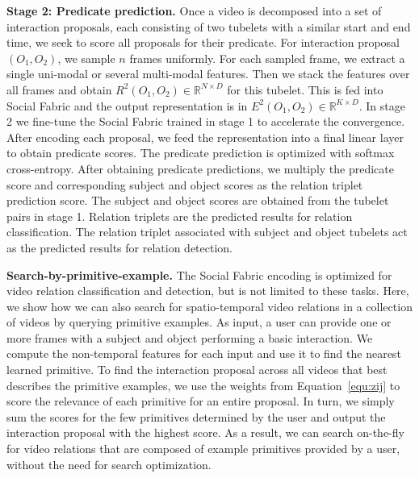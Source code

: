 \documentclass[10pt,twocolumn,letterpaper]{article}
\begin{document}
\textbf{Stage 2: Predicate prediction.}
Once a video is decomposed into a set of interaction proposals, each consisting of two tubelets with a similar start and end time, we seek to score all proposals for their predicate.
For interaction proposal $(O_1, O_2)$, we sample $n$ frames uniformly.
For each sampled frame, we extract a single uni-modal or several multi-modal features. Then we stack the features over all frames and obtain $R^2(O_1, O_2) \in \mathbb{R}^{N \times D}$ for this tubelet. This is fed into Social Fabric and the output representation is in $E^2(O_1,O_2) \in \mathbb{R}^{K \times D}$. 
In stage 2 we fine-tune the Social Fabric trained in stage 1 to accelerate the convergence. After encoding each proposal, we feed the representation into a final linear layer to obtain predicate scores. The predicate prediction is optimized with softmax cross-entropy.
After obtaining predicate predictions, we multiply the predicate score and corresponding subject and object scores as the relation triplet prediction score. The subject and object scores are obtained from the tubelet pairs in stage 1. Relation triplets are the predicted results for relation classification. The relation triplet associated with subject and object tubelets act as the predicted results for relation detection.

\textbf{Search-by-primitive-example.} The Social Fabric encoding is optimized for video relation classification and detection, but is not limited to these tasks. Here, we show how we can also search for spatio-temporal video relations in a collection of videos by querying primitive examples. 
As input, a user can provide one or more frames with a subject and object performing a basic interaction. We compute the non-temporal features for each input and use it to find the nearest learned primitive. To find the interaction proposal across all videos that best describes the primitive examples, we use the weights from Equation~\ref{equ:zij} to score the relevance of each primitive for an entire proposal. In turn, we simply sum the scores for the few primitives determined by the user and output the interaction proposal with the highest score. As a result, we can search on-the-fly for video relations that are composed of  example primitives provided by a user, without the need for search optimization.
\end{document}
